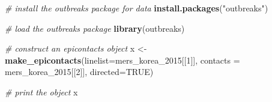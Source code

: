 \documentclass[9pt,a4paper,]{extarticle}
\newenvironment{Shaded}{\begin{snugshade}}{\end{snugshade}}
\newcommand{\KeywordTok}[1]{\textcolor[rgb]{0.13,0.29,0.53}{\textbf{#1}}}
\newcommand{\DataTypeTok}[1]{\textcolor[rgb]{0.13,0.29,0.53}{#1}}
\newcommand{\DecValTok}[1]{\textcolor[rgb]{0.00,0.00,0.81}{#1}}
\newcommand{\StringTok}[1]{\textcolor[rgb]{0.31,0.60,0.02}{#1}}
\newcommand{\CommentTok}[1]{\textcolor[rgb]{0.56,0.35,0.01}{\textit{#1}}}
\newcommand{\OtherTok}[1]{\textcolor[rgb]{0.56,0.35,0.01}{#1}}
\newcommand{\NormalTok}[1]{#1}
\theoremstyle{definition}
\theoremstyle{definition}
\theoremstyle{definition}
\theoremstyle{remark}
\begin{document}
\begin{Shaded}
\begin{Highlighting}[]
\CommentTok{# install the outbreaks package for data}
\KeywordTok{install.packages}\NormalTok{(}\StringTok{"outbreaks"}\NormalTok{)}
\end{Highlighting}
\end{Shaded}

\begin{Shaded}
\begin{Highlighting}[]
\CommentTok{# load the outbreaks package}
\KeywordTok{library}\NormalTok{(outbreaks)}

\CommentTok{# construct an epicontacts object}
\NormalTok{x <-}\StringTok{ }\KeywordTok{make_epicontacts}\NormalTok{(}\DataTypeTok{linelist=}\NormalTok{mers_korea_}\DecValTok{2015}\NormalTok{[[}\DecValTok{1}\NormalTok{]],}
                      \DataTypeTok{contacts =}\NormalTok{ mers_korea_}\DecValTok{2015}\NormalTok{[[}\DecValTok{2}\NormalTok{]],}
                      \DataTypeTok{directed=}\OtherTok{TRUE}\NormalTok{)}

\CommentTok{# print the object   }
\NormalTok{x               }
\end{Highlighting}
\end{Shaded}
\end{document}
